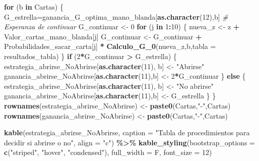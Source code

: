 \documentclass[12pt,a4paper,]{book}
\newenvironment{Shaded}{\begin{snugshade}}{\end{snugshade}}
\newcommand{\AttributeTok}[1]{\textcolor[rgb]{0.13,0.29,0.53}{#1}}
\newcommand{\CommentTok}[1]{\textcolor[rgb]{0.56,0.35,0.01}{\textit{#1}}}
\newcommand{\ControlFlowTok}[1]{\textcolor[rgb]{0.13,0.29,0.53}{\textbf{#1}}}
\newcommand{\DecValTok}[1]{\textcolor[rgb]{0.00,0.00,0.81}{#1}}
\newcommand{\FunctionTok}[1]{\textcolor[rgb]{0.13,0.29,0.53}{\textbf{#1}}}
\newcommand{\NormalTok}[1]{#1}
\newcommand{\OtherTok}[1]{\textcolor[rgb]{0.56,0.35,0.01}{#1}}
\newcommand{\SpecialCharTok}[1]{\textcolor[rgb]{0.81,0.36,0.00}{\textbf{#1}}}
\newcommand{\StringTok}[1]{\textcolor[rgb]{0.31,0.60,0.02}{#1}}
\numberwithin{dummy}{section}
\theoremstyle{ocrenumbox}
\theoremstyle{blacknumex}
\theoremstyle{blacknumbox}
\theoremstyle{ocrenum}
\theoremstyle{ocrenum}
\begin{document}
\begin{Shaded}
\begin{Highlighting}[]
\ControlFlowTok{for}\NormalTok{ (b }\ControlFlowTok{in}\NormalTok{ Cartas) \{}
\NormalTok{  G\_estrella}\OtherTok{=}\NormalTok{ganancia\_G\_optima\_mano\_blanda[}\FunctionTok{as.character}\NormalTok{(}\DecValTok{12}\NormalTok{),b]}
  \CommentTok{\# Esperanza de continuar}
\NormalTok{  G\_continuar }\OtherTok{\textless{}{-}} \DecValTok{0}
  \ControlFlowTok{for}\NormalTok{ (j }\ControlFlowTok{in} \DecValTok{1}\SpecialCharTok{:}\DecValTok{10}\NormalTok{) \{}
\NormalTok{    nueva\_z }\OtherTok{\textless{}{-}}\NormalTok{ z }\SpecialCharTok{+}\NormalTok{ Valor\_cartas\_mano\_blanda[j]}
\NormalTok{    G\_continuar }\OtherTok{\textless{}{-}}\NormalTok{ G\_continuar }\SpecialCharTok{+}\NormalTok{ Probabilidades\_sacar\_carta[j] }\SpecialCharTok{*} \FunctionTok{Calculo\_G\_0}\NormalTok{(nueva\_z,b,}\AttributeTok{tabla =}\NormalTok{ resultados\_tabla)}
\NormalTok{  \}}
  \ControlFlowTok{if}\NormalTok{ (}\DecValTok{2}\SpecialCharTok{*}\NormalTok{G\_continuar }\SpecialCharTok{\textgreater{}}\NormalTok{ G\_estrella) \{}
\NormalTok{    estrategia\_abrirse\_NoAbrirse[}\FunctionTok{as.character}\NormalTok{(}\DecValTok{11}\NormalTok{), b] }\OtherTok{\textless{}{-}} \StringTok{"Abrirse"}
\NormalTok{    ganancia\_abrirse\_NoAbrirse[}\FunctionTok{as.character}\NormalTok{(}\DecValTok{11}\NormalTok{),b] }\OtherTok{\textless{}{-}} \DecValTok{2}\SpecialCharTok{*}\NormalTok{G\_continuar}
\NormalTok{  \} }\ControlFlowTok{else}\NormalTok{ \{}
\NormalTok{    estrategia\_abrirse\_NoAbrirse[}\FunctionTok{as.character}\NormalTok{(}\DecValTok{11}\NormalTok{), b] }\OtherTok{\textless{}{-}} \StringTok{"No abrirse"}
\NormalTok{    ganancia\_abrirse\_NoAbrirse[}\FunctionTok{as.character}\NormalTok{(}\DecValTok{11}\NormalTok{),b] }\OtherTok{\textless{}{-}}\NormalTok{ G\_estrella}
\NormalTok{  \}}
\NormalTok{\}}
\FunctionTok{rownames}\NormalTok{(estrategia\_abrirse\_NoAbrirse) }\OtherTok{\textless{}{-}} \FunctionTok{paste0}\NormalTok{(Cartas,}\StringTok{"{-}"}\NormalTok{,Cartas)}
\FunctionTok{rownames}\NormalTok{(ganancia\_abrirse\_NoAbrirse) }\OtherTok{\textless{}{-}} \FunctionTok{paste0}\NormalTok{(Cartas,}\StringTok{"{-}"}\NormalTok{,Cartas)}

\FunctionTok{kable}\NormalTok{(estrategia\_abrirse\_NoAbrirse, }
      \AttributeTok{caption =} \StringTok{"Tabla de procedimientos para decidir si abrirse o no"}\NormalTok{,}
      \AttributeTok{align =} \StringTok{"c"}\NormalTok{) }\SpecialCharTok{\%\textgreater{}\%}
\FunctionTok{kable\_styling}\NormalTok{(}\AttributeTok{bootstrap\_options =} \FunctionTok{c}\NormalTok{(}\StringTok{"striped"}\NormalTok{, }\StringTok{"hover"}\NormalTok{, }\StringTok{"condensed"}\NormalTok{),}
              \AttributeTok{full\_width =}\NormalTok{ F, }\AttributeTok{font\_size =} \DecValTok{12}\NormalTok{)}


\end{Highlighting}
\end{Shaded}
\end{document}
